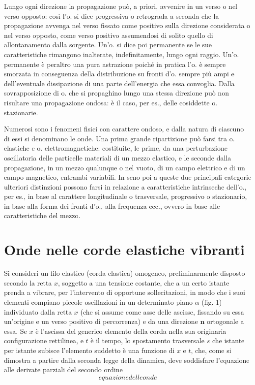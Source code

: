 \documentclass[a4paper]{article}
\begin{document}
Lungo ogni direzione la propagazione può, a priori, avvenire in un verso o nel verso opposto: così l'o. si dice progressiva o retrograda a seconda che la propagazione avvenga nel verso fissato come positivo sulla direzione considerata o nel verso opposto, come verso positivo assumendosi di solito quello di allontanamento dalla sorgente. Un'o. si dice poi permanente se le sue caratteristiche rimangono inalterate, indefinitamente, lungo ogni raggio. Un'o. permanente è peraltro una pura astrazione poiché in pratica l'o. è sempre smorzata in conseguenza della distribuzione su fronti d'o. sempre più ampi e dell'eventuale dissipazione di una parte dell'energia che essa convoglia. Dalla sovrapposizione di o. che si propaghino lungo una stessa direzione può non risultare una propagazione ondosa: è il caso, per es., delle cosiddette o. stazionarie. 

Numerosi sono i fenomeni fisici con carattere ondoso, e dalla natura di ciascuno di essi si denominano le onde. Una prima grande ripartizione può farsi tra o. elastiche e o. elettromagnetiche: costituite, le prime, da una perturbazione oscillatoria delle particelle materiali di un mezzo elastico, e le seconde dalla propagazione, in un mezzo qualunque o nel vuoto, di un campo elettrico e di un campo magnetico, entrambi variabili. In seno poi a queste due principali categorie ulteriori distinzioni possono farsi in relazione a caratteristiche intrinseche dell'o., per es., in base al carattere longitudinale o trasversale, progressivo o stazionario, in base alla forma dei fronti d'o., alla frequenza ecc., ovvero in base alle caratteristiche del mezzo. 

\section{Onde nelle corde elastiche vibranti}
Si consideri un filo elastico (corda elastica) omogeneo, preliminarmente disposto secondo la retta $x$, soggetto a una tensione costante, che a un certo istante prenda a vibrare, per l'intervento di opportune sollecitazioni, in modo che i suoi elementi compiano piccole oscillazioni in un determinato piano $\alpha$ (fig. 1) individuato dalla retta $x$ (che si assume come asse delle ascisse, fissando su essa un'origine e un verso positivo di percorrenza) e da una direzione $\mathbf{n}$ ortogonale a essa. Se $x$ è l'ascissa del generico elemento della corda nella sua originaria configurazione rettilinea, e $t$ è il tempo, lo spostamento trasversale $s$ che istante per istante subisce l'elemento suddetto è una funzione di $x$ e $t$, che, come si dimostra a partire dalla seconda legge della dinamica, deve soddisfare l'equazione alle derivate parziali del secondo ordine
\begin{equation}
\label{eqn:1}
equazione delle onde
\end{equation}
\end{document}
